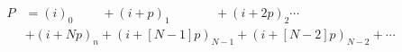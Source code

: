 \documentclass[preview]{standalone}
\begin{document}
\begin{align*}
P &= (i)_0\:\:\:\:\:\:\:\:\:\:+(i+p)_1\:\:\:\:\:\:\:\:\:\:\:\:\:\:\:\:+(i+2p)_2\cdots\\&+(i+Np)_n+(i+[N-1]p)_{N-1}+(i+[N-2]p)_{N-2}+\cdots
\end{align*}
\end{document}
